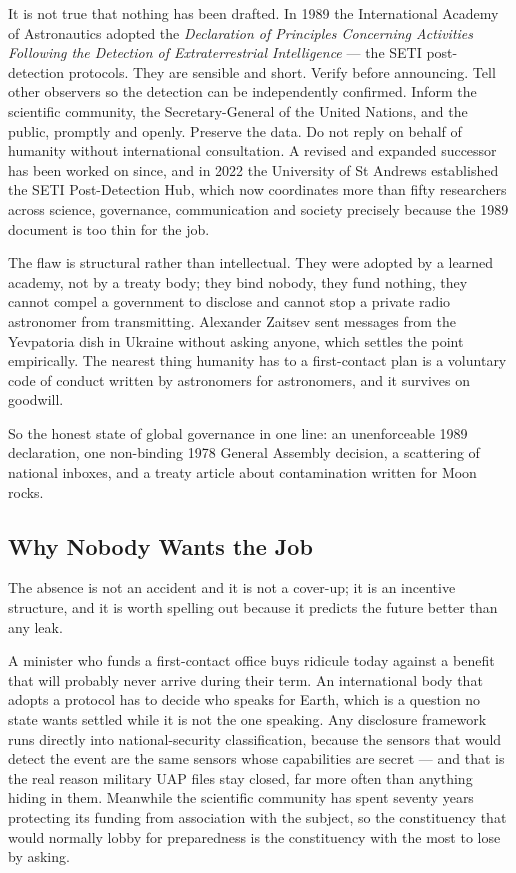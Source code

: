 It is not true that nothing has been drafted. In 1989 the International Academy of Astronautics
adopted the \emph{Declaration of Principles Concerning Activities Following the Detection of
Extraterrestrial Intelligence} --- the SETI post-detection protocols. They are sensible and short.
Verify before announcing. Tell other observers so the detection can be independently confirmed.
Inform the scientific community, the Secretary-General of the United Nations, and the public,
promptly and openly. Preserve the data. Do not reply on behalf of humanity without international
consultation. A revised and expanded successor has been worked on since, and in 2022 the University
of St Andrews established the SETI Post-Detection Hub, which now coordinates more than fifty
researchers across science, governance, communication and society precisely because the 1989
document is too thin for the job.

The flaw is structural rather than intellectual.  They were adopted by a learned academy, not by a treaty body; they bind nobody, they
fund nothing, they cannot compel a government to disclose and cannot stop a private radio astronomer
from transmitting. Alexander Zaitsev sent messages from the Yevpatoria dish in Ukraine without
asking anyone, which settles the point empirically. The nearest thing humanity has to a first-contact
plan is a voluntary code of conduct written by astronomers for astronomers, and it survives on
goodwill.

So the honest state of global governance in one line: an unenforceable 1989 declaration, one
non-binding 1978 General Assembly decision, a scattering of national inboxes, and a treaty article
about contamination written for Moon rocks. 

\subsection{Why Nobody Wants the Job}

The absence is not an accident and it is not a cover-up; it is an incentive structure, and it is
worth spelling out because it predicts the future better than any leak.

A minister who funds a first-contact office buys ridicule today against a benefit that will
probably never arrive during their term. An international body that adopts a protocol has to decide
who speaks for Earth, which is a question no state wants settled while it is not the one speaking.
Any disclosure framework runs directly into national-security classification, because the sensors
that would detect the event are the same sensors whose capabilities are secret --- and that is the
real reason military UAP files stay closed, far more often than anything hiding in them. Meanwhile
the scientific community has spent seventy years protecting its funding from association with the
subject, so the constituency that would normally lobby for preparedness is the constituency with
the most to lose by asking.

